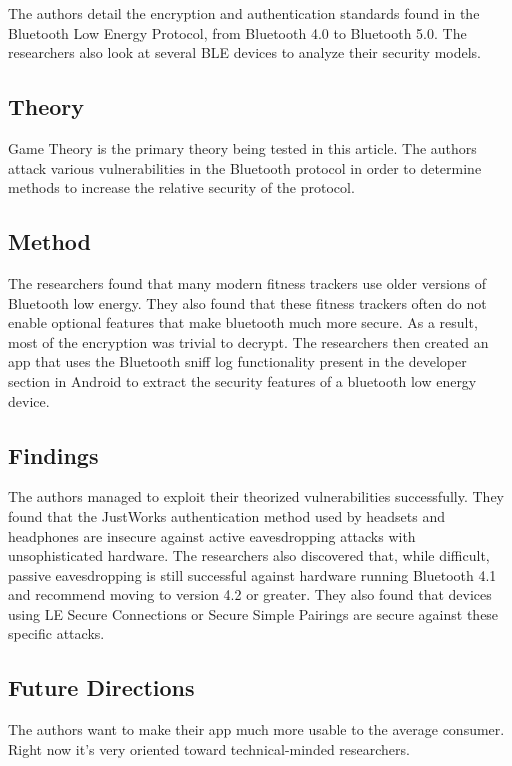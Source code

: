 \documentclass[letterpaper,12pt]{article}
\begin{document}
\noindent
The authors detail the encryption and authentication standards found in the Bluetooth Low Energy Protocol, from Bluetooth 4.0 to Bluetooth 5.0.  The researchers also look at several BLE devices to analyze their security models.
\subsection{Theory}

\noindent
Game Theory is the primary theory being tested in this article.  The authors attack various vulnerabilities in the Bluetooth protocol in order to determine methods to increase the relative security of the protocol.

\subsection{Method}

\noindent
The researchers found that many modern fitness trackers use older versions of Bluetooth low energy.  They also found that these fitness trackers often do not enable optional features that make bluetooth much more secure.  As a result, most of the encryption was trivial to decrypt.  The researchers then created an app that uses the Bluetooth sniff log functionality present in the developer section in Android to extract the security features of a bluetooth low energy device.

\subsection{Findings}

\noindent
The authors managed to exploit their theorized vulnerabilities successfully.  They found that the JustWorks authentication method used by headsets and headphones are insecure against active eavesdropping attacks with unsophisticated hardware.  The researchers also discovered that, while difficult, passive eavesdropping is still successful against hardware running Bluetooth 4.1 and recommend moving to version 4.2 or greater.  They also found that devices using LE Secure Connections or Secure Simple Pairings are secure against these specific attacks.

\subsection{Future Directions}

\noindent
The authors want to make their app much more usable to the average consumer.  Right now it's very oriented toward technical-minded researchers.
\end{document}
